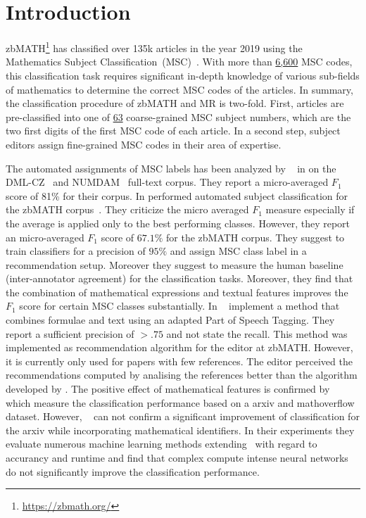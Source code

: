 \section{Introduction}\label{sec:intro}
zbMATH\footnote{\href{https://zbmath.org/}{{https://zbmath.org/}}} has classified over 135k articles in the year 2019 using the Mathematics Subject Classification~(MSC)~\cite{Khnemund2016}.
With more than \href{https://zbmath.org/classification/}{{6,600}} MSC codes, this classification task requires significant in-depth knowledge of various sub-fields of mathematics to determine the correct MSC codes of the articles.
In summary, the classification procedure of zbMATH and MR is two-fold.
First, articles are pre-classified into one of \href{https://msc2020.org}{{63}} coarse-grained MSC subject numbers, which are the two first digits of the first MSC code of each article.
In a second step, subject editors assign fine-grained MSC codes in their area of expertise.


The automated assignments of MSC labels has been analyzed by \citeauthor{RehurekS08}~\cite{RehurekS08} in \citeyear{RehurekS08} on the DML-CZ~\cite{SojkaR07} and NUMDAM~\cite{BoucheL17} full-text corpus.
They report a micro-averaged $F_1$ score of 81\% for their corpus.
In \citeyear{BarthelTB13} \citeauthor{BarthelTB13} performed automated subject classification for the zbMATH corpus~\cite{BarthelTB13}.
They criticize the micro averaged $F_1$ measure especially if the average is applied only to the best performing classes. However, they report an micro-averaged $F_1$ score of $67.1\%$ for the zbMATH corpus.
They suggest to train classifiers for a precision of $95\%$ and assign MSC class label in a recommendation setup.
Moreover they suggest to measure the human baseline (inter-annotator agreement) for the classification tasks.
Moreover, they find that the combination of mathematical expressions and textual features improves the $F_1$ score for certain MSC classes substantially.
In \citeyear{SchonebergS14} \citeauthor{SchonebergS14}~\cite{SchonebergS14} implement a method that combines formulae and text using an adapted Part of Speech Tagging.
They report a sufficient precision of $>.75$ and not state the recall.
This method was implemented as recommendation algorithm for the editor at zbMATH.
However, it is currently only used for papers with few references.
The editor perceived the recommendations computed by analising the references better than the algorithm developed by \citeauthor{SchonebergS14}.
The positive effect of mathematical features is confirmed by \citeauthor{SuzukiF17}~\cite{SuzukiF17} which measure the classification performance based on a arxiv and mathoverflow dataset.
However, \citeauthor{Scharpf2020}~\cite{Scharpf2020} can not confirm a significant improvement of classification for the arxiv while incorporating mathematical identifiers.
In their experiments they evaluate numerous machine learning methods extending~\cite{Evans17,SojkaNALS19} with regard to accurancy and runtime and find that complex compute intense neural networks do not significantly improve the classification performance.



